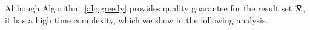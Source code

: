 %

Although Algorithm~\ref{alg:greedy} provides quality guarantee for the result set $\mathcal{R}$, it has a high time complexity, which we show in the following analysis.  

 




